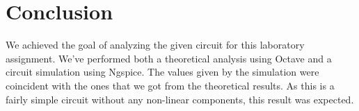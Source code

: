 \section{Conclusion}
\label{sec:conclusion}

We achieved the goal of analyzing the given circuit for this laboratory assignment. We've performed both a theoretical analysis using Octave and a circuit simulation using Ngspice. The values given by the simulation were coincident with the ones that we got from the theoretical results. As this is a fairly simple circuit without any non-linear components, this result was expected.
